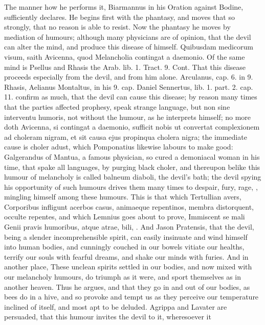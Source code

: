 {{The manner how he performs it, Biarmannus in his Oration against
Bodine, sufficiently declares. He begins first with the phantasy,
and moves that so strongly, that no reason is able to resist. Now the
phantasy he moves by mediation of humours; although many physicians are
of opinion, that the devil can alter the mind, and produce this disease
of himself. Quibusdam medicorum visum, saith Avicenna, quod
Melancholia contingat a daemonio. Of the same mind is Psellus and
Rhasis the Arab. lib. 1. Tract. 9. Cont. That this disease
proceeds especially from the devil, and from him alone. Arculanus, cap.
6. in 9. Rhasis, Aelianus Montaltus, in his 9. cap. Daniel Sennertus,
lib. 1. part. 2. cap. 11. confirm as much, that the devil can cause
this disease; by reason many times that the parties affected prophesy,
speak strange language, but non sine interventu humoris, not without
the humour, as he interprets himself; no more doth Avicenna, si
contingat a daemonio, sufficit nobis ut convertat complexionem ad
choleram nigram, et sit causa ejus propinqua cholera nigra; the
immediate cause is choler adust, which  Pomponatius likewise
labours to make good: Galgerandus of Mantua, a famous physician, so
cured a demoniacal woman in his time, that spake all languages, by
purging black choler, and thereupon belike this humour of melancholy is
called balneum diaboli, the devil's bath; the devil spying his
opportunity of such humours drives them many times to despair, fury,
rage, \etc{}, mingling himself among these humours. This is that which
Tertullian avers, Corporibus infligunt acerbos casus, animaeque
repentinos, membra distorquent, occulte repentes, \etc{} and which Lemnius
goes about to prove, Immiscent se mali Genii pravis humoribus, atque
atrae, bili, \etc{}. And Jason Pratensis, that the devil, being a
slender incomprehensible spirit, can easily insinuate and wind himself
into human bodies, and cunningly couched in our bowels vitiate our
healths, terrify our souls with fearful dreams, and shake our minds
with furies. And in another place, These unclean spirits settled in our
bodies, and now mixed with our melancholy humours, do triumph as it
were, and sport themselves as in another heaven. Thus he argues, and
that they go in and out of our bodies, as bees do in a hive, and so
provoke and tempt us as they perceive our temperature inclined of
itself, and most apt to be deluded.  Agrippa and Lavater
are persuaded, that this humour invites the devil to it, wheresoever it
}}
